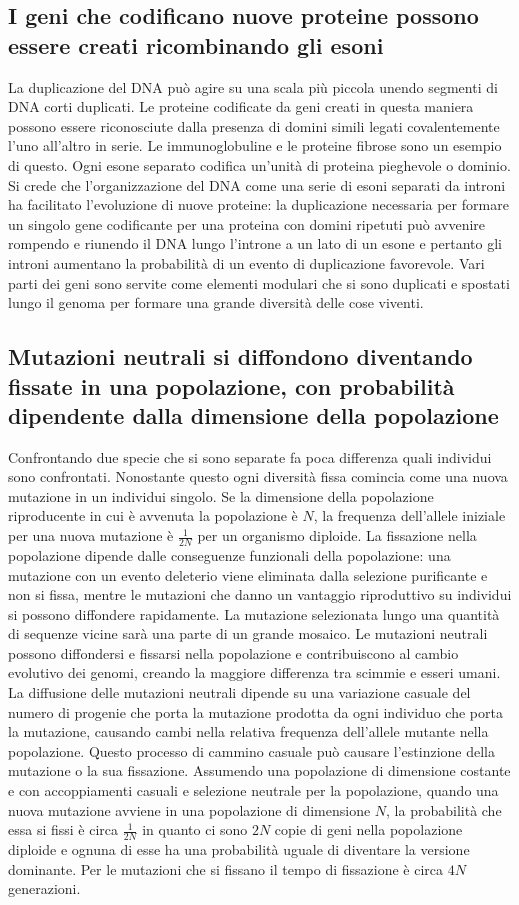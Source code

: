 \subsection{I geni che codificano nuove proteine possono essere creati ricombinando gli esoni}
La duplicazione del DNA pu\`o agire su una scala pi\`u piccola unendo segmenti di DNA corti duplicati. Le proteine codificate da geni creati in questa maniera possono essere riconosciute
dalla presenza di domini simili legati covalentemente l'uno all'altro in serie. Le immunoglobuline e le proteine fibrose sono un esempio di questo. Ogni esone separato codifica 
un'unit\`a di proteina pieghevole o dominio. Si crede che l'organizzazione del DNA come una serie di esoni separati da introni ha facilitato l'evoluzione di nuove proteine: la 
duplicazione necessaria per formare un singolo gene codificante per una proteina con domini ripetuti pu\`o avvenire rompendo e riunendo il DNA lungo l'introne a un lato di un esone e 
pertanto gli introni aumentano la probabilit\`a di un evento di duplicazione favorevole. Vari parti dei geni sono servite come elementi modulari che si sono duplicati e spostati lungo il
genoma per formare una grande diversit\`a delle cose viventi. 
\subsection{Mutazioni neutrali si diffondono diventando fissate in una popolazione, con probabilit\`a dipendente dalla dimensione della popolazione}
Confrontando due specie che si sono separate fa poca differenza quali individui sono confrontati. Nonostante questo ogni diversit\`a fissa comincia come una nuova mutazione in un 
individui singolo. Se la dimensione della popolazione riproducente in cui \`e avvenuta la popolazione \`e $N$, la frequenza dell'allele iniziale per una nuova mutazione \`e 
$\frac{1}{2N}$ per un organismo diploide. La fissazione nella popolazione dipende dalle conseguenze funzionali della popolazione: una mutazione con un evento deleterio viene eliminata
dalla selezione purificante e non si fissa, mentre le mutazioni che danno un vantaggio riproduttivo su individui si possono diffondere rapidamente. La mutazione selezionata lungo una 
quantit\`a di sequenze vicine sar\`a una parte di un grande mosaico. Le mutazioni neutrali possono diffondersi e fissarsi nella popolazione e contribuiscono al cambio evolutivo dei 
genomi, creando la maggiore differenza tra scimmie e esseri umani. La diffusione delle mutazioni neutrali dipende su una variazione casuale del numero di progenie che porta la mutazione
prodotta da ogni individuo che porta la mutazione, causando cambi nella relativa frequenza dell'allele mutante nella popolazione. Questo processo di cammino casuale pu\`o causare 
l'estinzione della mutazione o la sua fissazione. Assumendo una popolazione di dimensione costante e con accoppiamenti casuali e selezione neutrale per la popolazione, quando una nuova
mutazione avviene in una popolazione di dimensione $N$, la probabilit\`a che essa si fissi \`e circa $\frac{1}{2N}$ in quanto ci sono $2N$ copie di geni nella popolazione diploide e 
ognuna di esse ha una probabilit\`a uguale di diventare la versione dominante. Per le mutazioni che si fissano il tempo di fissazione \`e circa $4N$ generazioni. 
